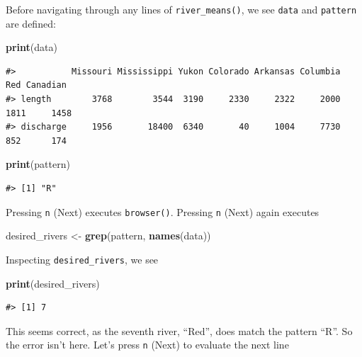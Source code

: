 \documentclass[
]{book}
\newenvironment{Shaded}{\begin{snugshade}}{\end{snugshade}}
\newcommand{\KeywordTok}[1]{\textcolor[rgb]{0.13,0.29,0.53}{\textbf{#1}}}
\newcommand{\NormalTok}[1]{#1}
\newcommand{\StringTok}[1]{\textcolor[rgb]{0.31,0.60,0.02}{#1}}
\begin{document}
Before navigating through any lines of \texttt{river\_means()}, we see \texttt{data} and \texttt{pattern} are defined:

\begin{Shaded}
\begin{Highlighting}[]
\KeywordTok{print}\NormalTok{(data)}
\end{Highlighting}
\end{Shaded}

\begin{verbatim}
#>           Missouri Mississippi Yukon Colorado Arkansas Columbia  Red Canadian
#> length        3768        3544  3190     2330     2322     2000 1811     1458
#> discharge     1956       18400  6340       40     1004     7730  852      174
\end{verbatim}

\begin{Shaded}
\begin{Highlighting}[]
\KeywordTok{print}\NormalTok{(pattern)}
\end{Highlighting}
\end{Shaded}

\begin{verbatim}
#> [1] "R"
\end{verbatim}

Pressing \texttt{n} (Next) executes \texttt{browser()}. Pressing \texttt{n} (Next) again executes

\begin{Shaded}
\begin{Highlighting}[]
\NormalTok{desired_rivers <-}\StringTok{ }\KeywordTok{grep}\NormalTok{(pattern, }\KeywordTok{names}\NormalTok{(data))}
\end{Highlighting}
\end{Shaded}

Inspecting \texttt{desired\_rivers}, we see

\begin{Shaded}
\begin{Highlighting}[]
\KeywordTok{print}\NormalTok{(desired_rivers)}
\end{Highlighting}
\end{Shaded}

\begin{verbatim}
#> [1] 7
\end{verbatim}

This seems correct, as the seventh river, ``Red'', does match the pattern ``R''. So the error isn't here. Let's press \texttt{n} (Next) to evaluate the next line
\end{document}
